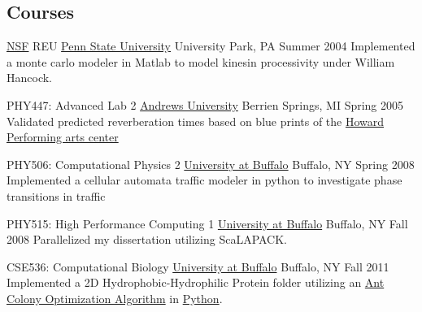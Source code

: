 

\begin{cventries}
  

\subsection{Courses}

  \cventry
    {\href{www.nsf.gov}{NSF} REU}
    {{\href{www.psu.edu}{Penn State University}}}
    {University Park, PA}
    {Summer 2004}
    {Implemented a monte carlo modeler in Matlab to model kinesin processivity under William Hancock.}

  \cventry
    {PHY447: Advanced Lab 2} %
    {\href{www.andrews.edu}{Andrews University}}
    {Berrien Springs, MI} %
    {Spring 2005} %
    {Validated predicted reverberation times based on blue prints of the \href{howard.andrews.edu}{Howard Performing arts center}}




  \cventry
    {PHY506: Computational Physics 2}
    {\href{www.buffalo.edu}{University at Buffalo}}
    {Buffalo, NY}
    {Spring 2008}
    {Implemented a cellular automata traffic modeler in python to investigate phase transitions in traffic}

  \cventry
	{PHY515: High Performance Computing 1}
    {\href{www.buffalo.edu}{University at Buffalo}}
    {Buffalo, NY}
    {Fall 2008}
    {Parallelized my dissertation utilizing ScaLAPACK.}

  \cventry
    {CSE536: Computational Biology}
    {\href{www.buffalo.edu}{University at Buffalo}}
    {Buffalo, NY}
    {Fall 2011}
	{Implemented a 2D Hydrophobic-Hydrophilic Protein folder utilizing an \href{https://en.wikipedia.org/wiki/Ant_colony_optimization_algorithms}{Ant Colony Optimization Algorithm} in \href{www.python.org}{Python}.}


\end{cventries}
